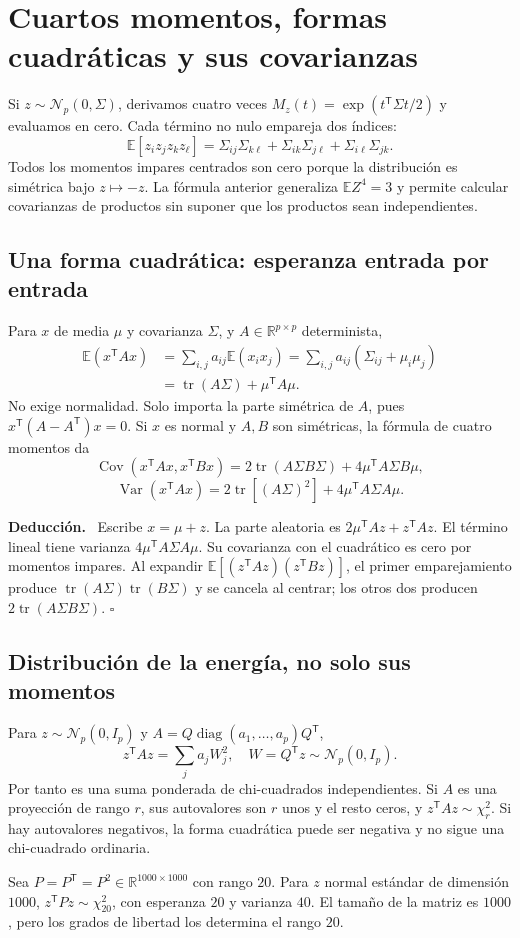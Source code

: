 \documentclass[11pt,a4paper]{article}
\newcommand{\R}{\mathbb R}
\newcommand{\E}{\mathbb E}
\newcommand{\T}{^{\mathsf T}}
\DeclareMathOperator{\Var}{Var}
\DeclareMathOperator{\Cov}{Cov}
\DeclareMathOperator{\tr}{tr}
\newenvironment{deduccion}{\par\textbf{Deducción.}\ }{\hfill$\square$\par}
\DeclareMathOperator{\diag}{diag}
\theoremstyle{definition}
\begin{document}
\section{Cuartos momentos, formas cuadráticas y sus covarianzas}
Si $z\sim\mathcal N_p(0,\Sigma)$, derivamos cuatro veces $M_z(t)=\exp(t\T\Sigma t/2)$ y evaluamos en cero. Cada término no nulo empareja dos índices:
\[
\boxed{\E[z_iz_jz_kz_\ell]=
\Sigma_{ij}\Sigma_{k\ell}+\Sigma_{ik}\Sigma_{j\ell}+\Sigma_{i\ell}\Sigma_{jk}}.
\]
Todos los momentos impares centrados son cero porque la distribución es simétrica bajo $z\mapsto-z$. La fórmula anterior generaliza $\E Z^4=3$ y permite calcular covarianzas de productos sin suponer que los productos sean independientes.
\subsection{Una forma cuadrática: esperanza entrada por entrada}
Para $x$ de media $\mu$ y covarianza $\Sigma$, y $A\in\R^{p\times p}$ determinista,
\begin{align*}
\E(x\T Ax)&=\sum_{i,j}a_{ij}\E(x_ix_j)
=\sum_{i,j}a_{ij}(\Sigma_{ij}+\mu_i\mu_j)\\
&=\tr(A\Sigma)+\mu\T A\mu.
\end{align*}
No exige normalidad. Solo importa la parte simétrica de $A$, pues $x\T(A-A\T)x=0$. Si $x$ es normal y $A,B$ son simétricas, la fórmula de cuatro momentos da
\[
\Cov(x\T Ax,x\T Bx)=2\tr(A\Sigma B\Sigma)+4\mu\T A\Sigma B\mu,
\]
\[
\boxed{\Var(x\T Ax)=2\tr[(A\Sigma)^2]+4\mu\T A\Sigma A\mu}.
\]
\begin{deduccion}
Escribe $x=\mu+z$. La parte aleatoria es $2\mu\T Az+z\T Az$. El término lineal tiene varianza $4\mu\T A\Sigma A\mu$. Su covarianza con el cuadrático es cero por momentos impares. Al expandir $\E[(z\T Az)(z\T Bz)]$, el primer emparejamiento produce $\tr(A\Sigma)\tr(B\Sigma)$ y se cancela al centrar; los otros dos producen $2\tr(A\Sigma B\Sigma)$.
\end{deduccion}
\subsection{Distribución de la energía, no solo sus momentos}
Para $z\sim\mathcal N_p(0,I_p)$ y $A=Q\diag(a_1,\ldots,a_p)Q\T$,
\[
z\T Az=\sum_j a_jW_j^2,
\quad W=Q\T z\sim\mathcal N_p(0,I_p).
\]
Por tanto es una suma ponderada de chi-cuadrados independientes. Si $A$ es una proyección de rango $r$, sus autovalores son $r$ unos y el resto ceros, y $z\T Az\sim\chi^2_r$. Si hay autovalores negativos, la forma cuadrática puede ser negativa y no sigue una chi-cuadrado ordinaria.
\begin{ejemplo}
Sea $P=P\T=P^2\in\R^{1000\times1000}$ con rango $20$. Para $z$ normal estándar de dimensión $1000$, $z\T Pz\sim\chi^2_{20}$, con esperanza $20$ y varianza $40$. El tamaño de la matriz es $1000$, pero los grados de libertad los determina el rango $20$.
\end{ejemplo}
\end{document}
